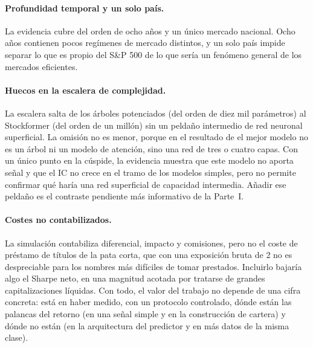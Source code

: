 \paragraph{Profundidad temporal y un solo país.} La evidencia cubre del orden de ocho años
y un único mercado nacional. Ocho años contienen pocos regímenes de mercado distintos, y
un solo país impide separar lo que es propio del S\&P 500 de lo que sería un fenómeno
general de los mercados eficientes.

\paragraph{Huecos en la escalera de complejidad.} La escalera salta de los árboles
potenciados (del orden de diez mil parámetros) al Stockformer (del orden de un millón) sin
un peldaño intermedio de red neuronal superficial. La omisión no es menor, porque en el
resultado de \textcite{gu2020empirical} el mejor modelo no es un árbol ni un modelo de
atención, sino una red de tres o cuatro capas. Con un único punto en la cúspide, la
evidencia muestra que este modelo no aporta señal y que el IC no crece en el tramo de los
modelos simples, pero no permite confirmar qué haría una red superficial de capacidad
intermedia. Añadir ese peldaño es el contraste pendiente más informativo de la Parte~I.

\paragraph{Costes no contabilizados.} La simulación contabiliza diferencial, impacto y
comisiones, pero no el coste de préstamo de títulos de la pata corta, que con una
exposición bruta de 2 no es despreciable para los nombres más difíciles de tomar
prestados. Incluirlo bajaría algo el Sharpe neto, en una magnitud acotada por tratarse de
grandes capitalizaciones líquidas. Con todo, el valor del trabajo no depende de una cifra
concreta: está en haber medido, con un protocolo controlado, dónde están las palancas del
retorno (en una señal simple y en la construcción de cartera) y dónde no están (en la
arquitectura del predictor y en más datos de la misma clase).
